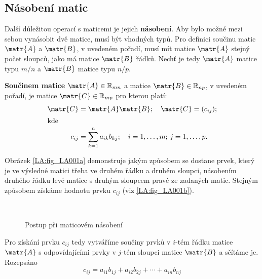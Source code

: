       

    \subsection{Násobení matic}\label{mai:IchapIIsecIIIsubIII}
      Další důležitou operací s maticemi je jejich \textbf{násobení}. Aby bylo možné mezi sebou 
      vynásobit dvě matice, musí být vhodných typů. Pro definici součinu matic \(\matr{A}\) a 
      \(\matr{B}\), v uvedeném pořadí, musí mít matice \(\matr{A}\) stejný počet sloupců, jako má 
      matice \(\matr{B}\) řádků. Nechť je tedy \(\matr{A}\) matice typu \(m/n\) a \(\matr{B}\) 
      matice typu \(n/p\).
      
      \begin{mdframed}[style=highlight]
        \begin{definition} 
          \textbf{Součinem matice} \(\matr{A} \in \mathbb{R}_{mn}\) a matice \(\matr{B} \in
          \mathbb{R}_{np}\), v uvedeném pořadí, je matice \(\matr{C} \in \mathbb{R}_{mp}\) pro
          kterou platí:
          \begin{align*}
            \matr{C} &= \matr{A}\matr{B}; \quad \matr{C} = (c_{ij}); \\
                 \shortintertext{kde}
            c_{ij} &= \sum^n_{k=1}{a_{ik}b_{kj}};\quad
                       i = 1,\ldots,m; \, j = 1,\ldots,p.
          \end{align*} 
        \end{definition}
      \end{mdframed}
      Obrázek \ref{LA:fig_LA001a} demonstruje jakým způsobem se dostane prvek, který je ve výsledné 
      matici třeba ve druhém řádku a druhém sloupci, násobením druhého řádku levé matice s druhým 
      sloupcem pravé ze zadaných matic. Stejným způsobem získáme hodnotu prvku \(c_{ij}\) (viz 
      \ref{LA:fig_LA001b}).
      \begin{figure}[ht!]
        \centering  
         \\
        \caption{Postup při maticovém násobení}
      \end{figure}

      Pro získání prvku \(c_{ij}\) tedy vytváříme součiny prvků v \(i\)-tém řádku matice
      \(\matr{A}\) s odpovídajícími prvky v \(j\)-tém sloupci matice \(\matr{B}\) a sčítáme je.
      Rozepsáno
      \begin{equation*}
        c_{ij} = a_{i1}b_{1j} + a_{i2}b_{2j} + \cdots + a_{in}b_{nj} 
      \end{equation*}
    
